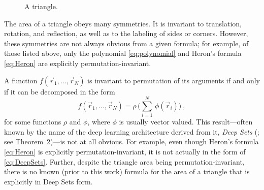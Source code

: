 \documentclass[10pt]{article}
\begin{document}
\begin{figure}[t!]
    \caption{A triangle.}
    \label{fig:triangle}
\end{figure}

The area of a triangle obeys many symmetries. It is invariant to translation, rotation, and reflection, as well as to the labeling of sides or corners. However, these symmetries are not always obvious from a given formula; for example, of those listed above, only the polynomial \eqref{eq:polynomial} and Heron's formula \eqref{eq:Heron} are explicitly permutation-invariant.

A function $f(\vec{r}_1, \dots, \vec{r}_N)$ is invariant to permutation of its arguments if and only if it can be decomposed in the form
\begin{equation}
    f(\vec{r}_1, \dots, \vec{r}_N) = \rho \, \big( \sum_{i=1}^{N} \, \phi(\vec{r}_i) \big)~,\label{eq:DeepSets}
\end{equation}
for some functions $\rho$ and $\phi$, where $\phi$ is usually vector valued.
This result---often known by the name of the deep learning architecture derived from it, \emph{Deep Sets} (\citealt{Zaheer+17deepsets}; see Theorem~2)---is not at all obvious.
For example, even though Heron's formula \eqref{eq:Heron} is explicitly permutation-invariant, it is not actually in the form of \eqref{eq:DeepSets}. 
Further, despite the triangle area being permutation-invariant, there is no known (prior to this work) formula for the area of a triangle that is explicitly in Deep Sets form.
\end{document}
